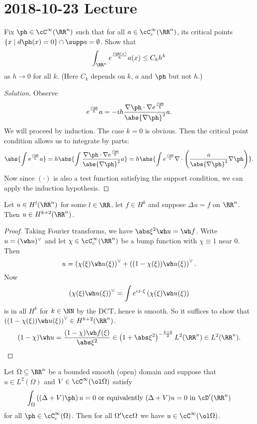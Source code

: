\section{2018-10-23 Lecture}

\begin{exer}
  Fix $\ph\in\cC^\infty(\RR^n)$ such that for all $a\in\cC_c^\infty(\RR^n)$, its critical points $\{ x \mid d\ph(x)=0 \} \cap \supp a = \emptyset$.
  Show that
  \[ \int_{\RR^n} e^\frac{i\ph(x)}{h}a(x) \leq C_kh^k \]
  as $h\to0$ for all $k$.
  (Here $C_k$ depends on $k$, $a$ and $\ph$ but not $h$.)
\end{exer}

\begin{proof}[Solution]
  Observe
  \[ e^\frac{i\ph}{h}a = -ih\frac{\nabla\ph\cdot\nabla e^\frac{i\ph}{h}}{\abs{\nabla\ph}^2}a. \]
  We will proceed by induction.
  The case $k=0$ is obvious.
  Then the critical point condition allows us to integrate by parts:
  \[ \abs{\int e^\frac{i\ph}{h}a} = h \abs{\int\frac{\nabla\ph\cdot\nabla e^\frac{i\ph}{h}}{\abs{\nabla\ph}^2}a} = h \abs{\int e^\frac{i\ph}h\nabla\cdot\left( \frac a{\abs{\nabla\ph}^2}\nabla\ph \right)}. \]
  Now since $(\cdot)$ is also a test function satisfying the support condition, we can apply the induction hypothesis.
\end{proof}

\begin{exer}
  Let $u\in H^l(\RR^n)$ for some $l\in\RR$, let $f\in H^k$ and suppose $\Delta u=f$ on $\RR^n$.
  Then $u\in H^{k+2}(\RR^n)$.
\end{exer}

\begin{proof}
  Taking Fourier transforms, we have $\abs\xi^2\wh u=\wh f$.
  Write $u=(\wh u)^\vee$ and let $\chi\in\cC_c^\infty(\RR^n)$ be a bump function with $\chi\equiv1$ near $0$.
  Then
  \[ u = \left( \chi(\xi)\wh u(\xi) \right)^\vee + \left( (1-\chi(\xi))\wh u(\xi) \right)^\vee. \]
  Now
  \[ \left( \chi(\xi)\wh u(\xi) \right)^\vee = \int e^{ix\cdot\xi}\left( \chi(\xi)\wh u(\xi) \right) \]
  is in all $H^k$ for $k\in\NN$ by the DCT, hence is smooth.
  So it suffices to show that $\left( (1-\chi(\xi))\wh u(\xi) \right)^\vee\in H^{k+2}(\RR^n)$.
  \[ (1-\chi)\wh u = \frac{(1-\chi)\wh f(\xi)}{\abs\xi^2} \in \left( 1+\abs\xi^2 \right)^{-\frac{k+2}{2}}L^2(\RR^n)\in L^2(\RR^n).\qedhere \]
\end{proof}

\begin{exer}
  Let $\Omega\subseteq\RR^n$ be a bounded smooth (open) domain and suppose that $u\in L^2(\Omega)$ and $V\in\cC^\infty(\ol\Omega)$ satisfy
  \[ \int_\Omega \left( (\Delta+V)\ph \right)u=0 \text{ or equivalently } (\Delta+V)u=0 \text{ in } \cD'(\RR^n) \]
  for all $\ph\in\cC_c^\infty(\Omega)$.
  Then for all $\Omega'\cc\Omega$ we have $u\in\cC^\infty(\ol\Omega)$.
\end{exer}

